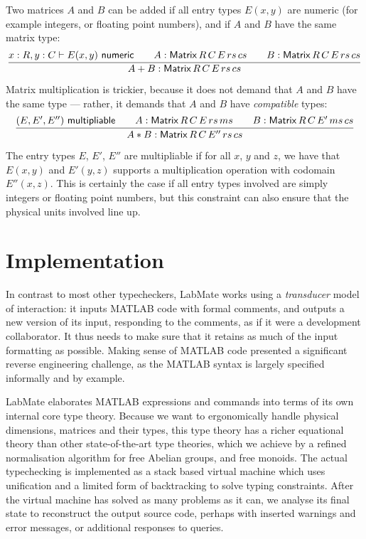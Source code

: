 \documentclass{IMEKO2024}
\newcommand{\isadd}[1]{#1\ \textsf{numeric}}
\newcommand{\ismult}[3]{(#1, #2, #3)\ \textsf{multipliable}}
\newcommand{\Matrix}[5]{\mathsf{Matrix}\,#1\,#2\,#3\,#4\,#5}
\newcommand{\remph}{\emph}
\begin{document}
Two matrices $A$ and $B$ can be added if all entry types $E(x, y)$ are
numeric (for example integers, or floating point numbers), and if $A$
and $B$ have the same matrix type:
%
\[
  \infer{A + B : \Matrix{R}{C}{E}{rs}{cs}}
  {
    x : R, y : C \vdash \isadd{E(x, y)}
    &\quad
    A : \Matrix{R}{C}{E}{rs}{cs}
    &\quad
    B : \Matrix{R}{C}{E}{rs}{cs}
  }
\]
%
Matrix multiplication is trickier, because it does not demand that $A$
and $B$ have the same type --- rather, it demands that $A$ and $B$
have \remph{compatible} types:
%
\[
  \infer{A * B : \Matrix{R}{C}{E''}{rs}{cs}}
  {
    \ismult{E}{E'}{E''}
    &\quad
    A : \Matrix{R}{C}{E}{rs}{ms}
    &\quad
    B : \Matrix{R}{C}{E'}{ms}{cs}
  }
\]
The entry types $E$, $E'$, $E''$ are multipliable if for all $x$, $y$
and $z$, we have that $E(x, y)$ and $E'(y, z)$ supports a
multiplication operation with codomain $E''(x, z)$.
%
This is certainly the case if all entry types involved are simply
integers or floating point numbers, but this constraint can also
ensure that the physical units involved line up.



\section{Implementation}

In contrast to most other typecheckers, LabMate works using a
\remph{transducer} model of interaction: it inputs MATLAB code with
formal comments, and outputs a new version of its input, responding to
the comments, as if it were a development collaborator.  It thus needs
to make sure that it retains as much of the input formatting as
possible.  Making sense of MATLAB code presented a significant reverse
engineering challenge, as the MATLAB syntax is largely specified
informally and by example.

LabMate elaborates MATLAB expressions and commands into terms of its own internal core type theory.
%
Because we want to ergonomically handle physical dimensions, matrices
and their types, this type theory has a richer equational theory than
other state-of-the-art type theories, which we achieve by a refined
normalisation algorithm for free Abelian groups, and free monoids.
%
The actual typechecking is implemented as a stack based virtual machine which uses unification and a limited form of backtracking to solve typing constraints.
%
After the virtual machine has solved as many problems as it can, we analyse its final state to reconstruct the output source code, perhaps with inserted warnings and error messages, or additional responses to queries.
\end{document}
